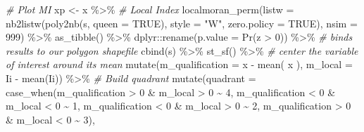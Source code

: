 \documentclass[
  12pt,
]{article}
\newenvironment{Shaded}{\begin{snugshade}}{\end{snugshade}}
\newcommand{\AttributeTok}[1]{\textcolor[rgb]{0.77,0.63,0.00}{#1}}
\newcommand{\CommentTok}[1]{\textcolor[rgb]{0.56,0.35,0.01}{\textit{#1}}}
\newcommand{\ConstantTok}[1]{\textcolor[rgb]{0.00,0.00,0.00}{#1}}
\newcommand{\DecValTok}[1]{\textcolor[rgb]{0.00,0.00,0.81}{#1}}
\newcommand{\FunctionTok}[1]{\textcolor[rgb]{0.00,0.00,0.00}{#1}}
\newcommand{\NormalTok}[1]{#1}
\newcommand{\OtherTok}[1]{\textcolor[rgb]{0.56,0.35,0.01}{#1}}
\newcommand{\SpecialCharTok}[1]{\textcolor[rgb]{0.00,0.00,0.00}{#1}}
\newcommand{\StringTok}[1]{\textcolor[rgb]{0.31,0.60,0.02}{#1}}
\begin{document}
\begin{Shaded}
\begin{Highlighting}[]
  \CommentTok{\# Plot MI}
\NormalTok{  xp }\OtherTok{\textless{}{-}}\NormalTok{ x }\SpecialCharTok{\%\textgreater{}\%} 
    \CommentTok{\# Local Index}
    \FunctionTok{localmoran\_perm}\NormalTok{(}\AttributeTok{listw =} \FunctionTok{nb2listw}\NormalTok{(}\FunctionTok{poly2nb}\NormalTok{(s, }\AttributeTok{queen =} \ConstantTok{TRUE}\NormalTok{),}
                                     \AttributeTok{style =} \StringTok{"W"}\NormalTok{,}
                                     \AttributeTok{zero.policy =} \ConstantTok{TRUE}\NormalTok{),}
                    \AttributeTok{nsim =} \DecValTok{999}\NormalTok{) }\SpecialCharTok{\%\textgreater{}\%} 
    \FunctionTok{as\_tibble}\NormalTok{() }\SpecialCharTok{\%\textgreater{}\%} 
\NormalTok{    dplyr}\SpecialCharTok{::}\FunctionTok{rename}\NormalTok{(}\AttributeTok{p.value =} \StringTok{\textasciigrave{}}\AttributeTok{Pr(z \textgreater{} 0)}\StringTok{\textasciigrave{}}\NormalTok{) }\SpecialCharTok{\%\textgreater{}\%} 
    \CommentTok{\# binds results to our polygon shapefile}
    \FunctionTok{cbind}\NormalTok{(s) }\SpecialCharTok{\%\textgreater{}\%} 
    \FunctionTok{st\_sf}\NormalTok{() }\SpecialCharTok{\%\textgreater{}\%} 
    \CommentTok{\# center the variable of interest around its mean}
    \FunctionTok{mutate}\NormalTok{(}\AttributeTok{m\_qualification =}\NormalTok{ x }\SpecialCharTok{{-}} \FunctionTok{mean}\NormalTok{( x ),}
           \AttributeTok{m\_local =}\NormalTok{ Ii }\SpecialCharTok{{-}} \FunctionTok{mean}\NormalTok{(Ii)) }\SpecialCharTok{\%\textgreater{}\%} 
    \CommentTok{\# Build quadrant}
    \FunctionTok{mutate}\NormalTok{(}\AttributeTok{quadrant =} \FunctionTok{case\_when}\NormalTok{(m\_qualification }\SpecialCharTok{\textgreater{}} \DecValTok{0} \SpecialCharTok{\&}\NormalTok{ m\_local }\SpecialCharTok{\textgreater{}} \DecValTok{0} \SpecialCharTok{\textasciitilde{}} \DecValTok{4}\NormalTok{,}
\NormalTok{                                m\_qualification }\SpecialCharTok{\textless{}} \DecValTok{0} \SpecialCharTok{\&}\NormalTok{ m\_local }\SpecialCharTok{\textless{}} \DecValTok{0} \SpecialCharTok{\textasciitilde{}} \DecValTok{1}\NormalTok{,}
\NormalTok{                                m\_qualification }\SpecialCharTok{\textless{}} \DecValTok{0} \SpecialCharTok{\&}\NormalTok{ m\_local }\SpecialCharTok{\textgreater{}} \DecValTok{0} \SpecialCharTok{\textasciitilde{}} \DecValTok{2}\NormalTok{,}
\NormalTok{                                m\_qualification }\SpecialCharTok{\textgreater{}} \DecValTok{0} \SpecialCharTok{\&}\NormalTok{ m\_local }\SpecialCharTok{\textless{}} \DecValTok{0} \SpecialCharTok{\textasciitilde{}} \DecValTok{3}\NormalTok{),}

\end{Highlighting}
\end{Shaded}
\end{document}

